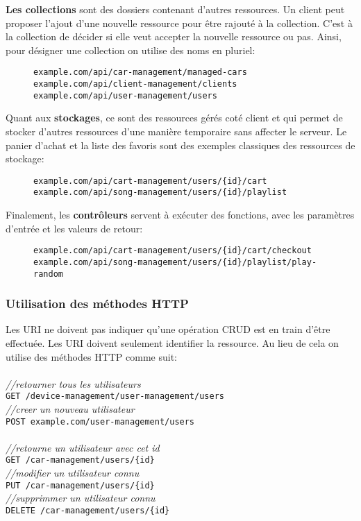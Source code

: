 \textbf{Les collections} sont des dossiers contenant d'autres ressources. Un client peut proposer l'ajout d'une nouvelle ressource pour être rajouté à la collection. C'est à la collection de décider si elle veut accepter la nouvelle ressource ou pas. Ainsi, pour désigner une collection on utilise des noms en pluriel: 
\begin{figure}[h!]
	\begin{lstlisting}[frame=leftline]
example.com/api/car-management/managed-cars
example.com/api/client-management/clients
example.com/api/user-management/users
	\end{lstlisting}
\end{figure}

Quant aux \textbf{stockages}, ce sont des ressources gérés coté client et qui permet de stocker d'autres ressources d'une manière temporaire sans affecter le serveur. Le panier d'achat et la liste des favoris sont des exemples classiques des ressources de stockage: 
\begin{figure}[h!]
	\begin{lstlisting}[frame=leftline]
example.com/api/cart-management/users/{id}/cart
example.com/api/song-management/users/{id}/playlist
	\end{lstlisting}
\end{figure}

Finalement, les \textbf{contrôleurs} servent à exécuter des fonctions, avec les paramètres d'entrée et les valeurs de retour: 
\begin{figure}[h!]
	\begin{lstlisting}[frame=leftline]
example.com/api/cart-management/users/{id}/cart/checkout
example.com/api/song-management/users/{id}/playlist/play-random
	\end{lstlisting}
\end{figure}

\subsubsection{Utilisation des méthodes HTTP}
Les URI ne doivent pas indiquer qu'une opération CRUD est en train d'être effectuée. Les URI doivent seulement identifier la ressource. Au lieu de cela on utilise des méthodes HTTP comme suit: \\
\\
\emph{//retourner tous les utilisateurs\\}
\verb|GET /device-management/user-management/users|\\
\emph{//creer un nouveau utilisateur\\}
\verb|POST example.com/user-management/users|
\\
\\
\emph{//retourne un utilisateur avec cet id\\}
\verb|GET /car-management/users/{id}|\\
\emph{//modifier un utilisateur connu\\}
\verb|PUT /car-management/users/{id}|\\
\emph{//supprimmer un utilisateur connu\\}
\verb|DELETE /car-management/users/{id}|\\



